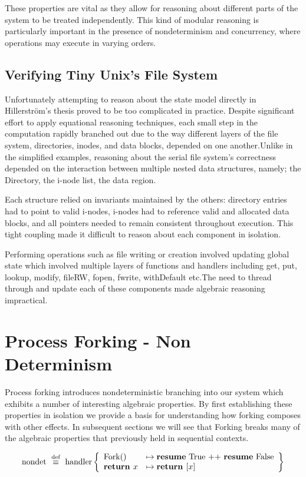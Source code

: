 \documentclass[logo,bsc,singlespacing,parskip]{infthesis}
\begin{document}
These properties are vital as they allow for reasoning about different parts of the system to be treated independently. This kind of modular reasoning is particularly important in the presence of nondeterminism and concurrency, where operations may execute in varying orders.


\subsection{Verifying Tiny Unix's File System}
Unfortunately attempting to reason about the state model directly in Hillerström's thesis proved to be too complicated in practice. Despite significant effort to apply equational reasoning techniques, each small step in the computation rapidly branched out due to the way different layers of the file system, directories, inodes, and data blocks, depended on one another.Unlike in the simplified examples, reasoning about the serial file system's correctness depended on the interaction between multiple nested data structures, namely; the Directory, the i-node list, the data region. 

Each structure relied on invariants maintained by the others: directory entries had to point to valid i-nodes, i-nodes had to reference valid and allocated data blocks, and all pointers needed to remain consistent throughout execution. This tight coupling made it difficult to reason about each component in isolation.

Performing operations such as file writing or creation involved updating global state which involved multiple layers of functions and handlers including get, put, lookup, modify, fileRW, fopen, fwrite, withDefault etc.The need to thread through and update each of these components made algebraic reasoning impractical.


\section{Process Forking - Non Determinism}
Process forking introduces nondeterministic branching into our system which exhibits a number of interesting algebraic properties. By first establishing these properties in isolation we provide a basis for understanding how forking composes with other effects. In subsequent sections we will see that Forking breaks many of the algebraic properties that previously held in sequential contexts.


\[
\text{nondet} \ \overset{\text{def}}{\equiv} \ \text{handler} \left\{
\begin{array}{ll}
\text{Fork}() &\mapsto \text{\textbf{resume} True ++ \textbf{resume} False} \\

\textbf{return } x &\mapsto \textbf{return } [x]
\end{array}
\right\}
\]
\end{document}
